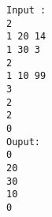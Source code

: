 \begin{verbatim}
Input :
2 
1 20 14 
1 30 3 
2 
1 10 99 
3 
2 
2 
0 
Ouput: 
0 
20 
30 
10 
0 
\end{verbatim}
